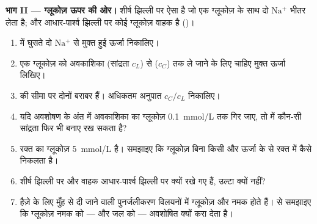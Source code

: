\begin{problem}
\medskip
\noindent\textbf{भाग II --- ग्लूकोज़ ऊपर की ओर।}
शीर्ष झिल्ली पर ऐसा  है जो एक ग्लूकोज़ के साथ दो $\mathrm{Na^+}$
भीतर लेता है; और आधार-पार्श्व झिल्ली पर कोई ग्लूकोज़ वाहक है ()।
\begin{enumerate}[resume]
  \item {} में घुसते दो $\mathrm{Na^+}$ से मुक्त हुई ऊर्जा
        निकालिए।
  \item एक ग्लूकोज़ को अवकाशिका (सांद्रता $c_L$) से  ($c_C$)
        तक ले जाने के लिए चाहिए मुक्त ऊर्जा लिखिए।
  \item {} की सीमा पर दोनों बराबर हैं। अधिकतम अनुपात $c_C/c_L$
        निकालिए।
  \item यदि अवशोषण के अंत में अवकाशिका का ग्लूकोज़ \qty{0.1}{mmol/L}
        तक गिर जाए, तो   में कौन-सी सांद्रता फिर भी
        बनाए रख सकता है?
  \item रक्त का ग्लूकोज़ \qty{5}{mmol/L} है। समझाइए कि ग्लूकोज़ बिना
        किसी और ऊर्जा के  से रक्त में कैसे निकलता है।
  \item {} शीर्ष झिल्ली पर और वाहक आधार-पार्श्व झिल्ली पर क्यों रखे
        गए हैं, उल्टा क्यों नहीं?
  \item हैज़े के लिए मुँह से दी जाने वाली पुनर्जलीकरण विलयनों में
        ग्लूकोज़ और नमक होते हैं।  से समझाइए कि ग्लूकोज़ नमक को
        --- और जल को --- अवशोषित क्यों करा देता है।
\end{enumerate}


\end{problem}
